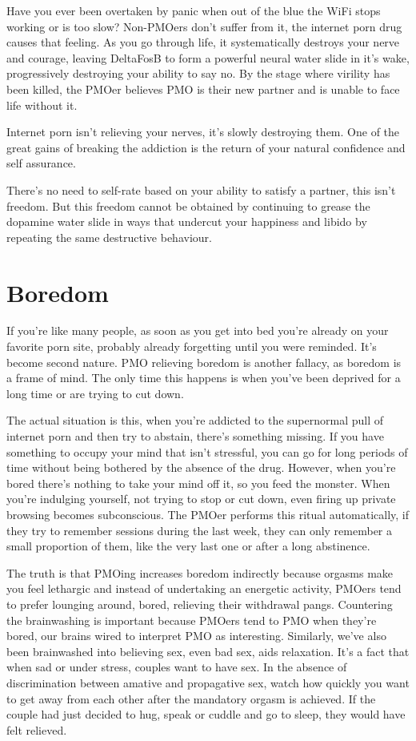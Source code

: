 \documentclass[easypeasy.tex]{subfiles}
\begin{document}
Have you ever been overtaken by panic when out of the blue the WiFi stops working or is too slow? Non-PMOers don't suffer from it, the internet porn drug causes that feeling. As you go through life, it systematically destroys your nerve and courage, leaving DeltaFosB to form a powerful neural water slide in it's wake, progressively destroying your ability to say no. By the stage where virility has been killed, the PMOer believes PMO is their new partner and is unable to face life without it.

Internet porn isn't relieving your nerves, it's slowly destroying them. One of the great gains of breaking the addiction is the return of your natural confidence and self assurance.

There's no need to self-rate based on your ability to satisfy a partner, this isn't freedom. But this freedom cannot be obtained by continuing to grease the dopamine water slide in ways that undercut your happiness and libido by repeating the same destructive behaviour.

\section{Boredom}

If you're like many people, as soon as you get into bed you're already on your favorite porn site, probably already forgetting until you were reminded. It's become second nature. PMO relieving boredom is another fallacy, as boredom is a frame of mind. The only time this happens is when you've been deprived for a long time or are trying to cut down.

The actual situation is this, when you're addicted to the supernormal pull of internet porn and then try to abstain, there's something missing. If you have something to occupy your mind that isn't stressful, you can go for long periods of time without being bothered by the absence of the drug. However, when you're bored there's nothing to take your mind off it, so you feed the monster. When you're indulging yourself, not trying to stop or cut down, even firing up private browsing becomes subconscious. The PMOer performs this ritual automatically, if they try to remember sessions during the last week, they can only remember a small proportion of them, like the very last one or after a long abstinence.

The truth is that PMOing increases boredom indirectly because orgasms make you feel lethargic and instead of undertaking an energetic activity, PMOers tend to prefer lounging around, bored, relieving their withdrawal pangs. Countering the brainwashing is important because PMOers tend to PMO when they're bored, our brains wired to interpret PMO as interesting. Similarly, we've also been brainwashed into believing sex, even bad sex, aids relaxation. It's a fact that when sad or under stress, couples want to have sex. In the absence of discrimination between amative and propagative sex, watch how quickly you want to get away from each other after the mandatory orgasm is achieved. If the couple had just decided to hug, speak or cuddle and go to sleep, they would have felt relieved.
\end{document}
